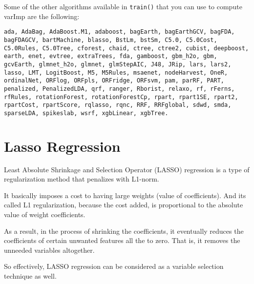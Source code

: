 \documentclass[]{book}
\begin{document}
Some of the other algorithms available in \texttt{train()} that you can use to compute varImp are the following:

\begin{verbatim}
ada, AdaBag, AdaBoost.M1, adaboost, bagEarth, bagEarthGCV, bagFDA, bagFDAGCV, bartMachine, blasso, BstLm, bstSm, C5.0, C5.0Cost, C5.0Rules, C5.0Tree, cforest, chaid, ctree, ctree2, cubist, deepboost, earth, enet, evtree, extraTrees, fda, gamboost, gbm_h2o, gbm, gcvEarth, glmnet_h2o, glmnet, glmStepAIC, J48, JRip, lars, lars2, lasso, LMT, LogitBoost, M5, M5Rules, msaenet, nodeHarvest, OneR, ordinalNet, ORFlog, ORFpls, ORFridge, ORFsvm, pam, parRF, PART, penalized, PenalizedLDA, qrf, ranger, Rborist, relaxo, rf, rFerns, rfRules, rotationForest, rotationForestCp, rpart, rpart1SE, rpart2, rpartCost, rpartScore, rqlasso, rqnc, RRF, RRFglobal, sdwd, smda, sparseLDA, spikeslab, wsrf, xgbLinear, xgbTree.
\end{verbatim}

\hypertarget{lasso-regression}{%
\section{Lasso Regression}\label{lasso-regression}}

Least Absolute Shrinkage and Selection Operator (LASSO) regression is a type of regularization method that penalizes with L1-norm.

It basically imposes a cost to having large weights (value of coefficients). And its called L1 regularization, because the cost added, is proportional to the absolute value of weight coefficients.

As a result, in the process of shrinking the coefficients, it eventually reduces the coefficients of certain unwanted features all the to zero. That is, it removes the unneeded variables altogether.

So effectively, LASSO regression can be considered as a variable selection technique as well.
\end{document}
